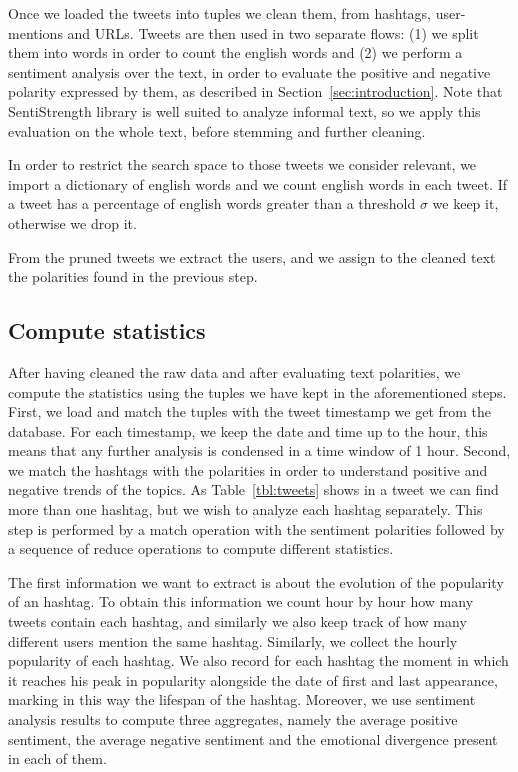 Once we loaded the tweets into tuples we clean them, from hashtags, user-mentions and URLs. 
Tweets are then used in two separate flows: (1) we split them into words in order to count the english words and (2) we perform a sentiment analysis over the text, in order to evaluate the positive and negative polarity expressed by them, as described in Section~\ref{sec:introduction}.
Note that SentiStrength library is well suited to analyze informal text, so we apply this evaluation on the whole text, before stemming and further cleaning. 

In order to restrict the search space to those tweets we consider relevant, we import a dictionary of english words and we count english words in each tweet. 
If a tweet has a percentage of english words greater than a threshold $\sigma$ we keep it, otherwise we drop it. 

From the pruned tweets we extract the users, and we assign to the cleaned text the polarities found in the previous step. 


\subsection{Compute statistics}
\label{sec:statistics}

After having cleaned the raw data and after evaluating text polarities, we compute the statistics using the tuples we have kept in the aforementioned steps. 
First, we load and match the tuples with the tweet timestamp we get from the database.
For each timestamp, we  keep the date and time up to the hour, this means that any further analysis is condensed in a time window of 1 hour.
Second, we match the hashtags with the polarities in order to understand positive and negative trends of the topics. 
As Table~\ref{tbl:tweets} shows in a tweet we can find more than one hashtag, but we wish to analyze each hashtag separately.
This step is performed by a match operation with the sentiment polarities followed by a sequence of reduce operations to compute different statistics.

The first information we want to extract is about the evolution of the popularity of an hashtag.
To obtain this information we count hour by hour how many tweets contain each hashtag, and similarly we also keep track of how many different users mention the same hashtag.
Similarly, we collect the hourly popularity of each hashtag.
We also record for each hashtag the moment in which it reaches his peak in popularity alongside the date of first and last appearance, marking in this way the lifespan of the hashtag.
Moreover, we use sentiment analysis results to compute three aggregates, namely the average positive sentiment, the average negative sentiment and the emotional divergence present in each of them.

